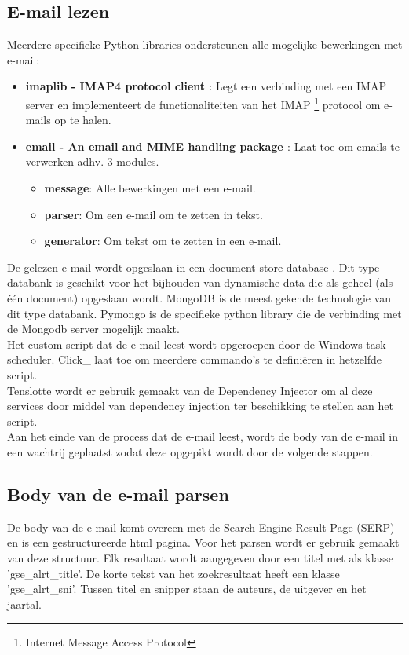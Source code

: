 \subsection{E-mail lezen}
Meerdere specifieke Python libraries ondersteunen alle mogelijke bewerkingen met e-mail:
\begin{itemize}
    \item \textbf{imaplib - IMAP4 protocol client \autocite{Imaplib2025}}: Legt een verbinding met een IMAP server en implementeert de functionaliteiten van het IMAP \footnote{Internet Message Access Protocol} protocol om e-mails op te halen.\autocite{Imap2025}
    \item \textbf{email - An email and MIME handling package \autocite{Email2025}}: Laat toe om emails te verwerken adhv. 3 modules.
    \begin{itemize}
        \item \textbf{message}: Alle bewerkingen met een e-mail.
        \item \textbf{parser}: Om een e-mail om te zetten in tekst.
        \item \textbf{generator}: Om tekst om te zetten in een e-mail. 
    \end{itemize}
\end{itemize}
De gelezen e-mail wordt opgeslaan in een document store database \autocite{Documentstore2025}. Dit type databank is geschikt voor het bijhouden van dynamische data die als geheel (als één document) opgeslaan wordt. MongoDB \autocite{Mongodb2025} is de meest gekende technologie van dit type databank. Pymongo \autocite{Pymongo2025} is de specifieke python library die de verbinding met de Mongodb server mogelijk maakt.\\
Het custom script dat de e-mail leest wordt opgeroepen door de Windows task scheduler. Click\_ \autocite{Click2025} laat toe om meerdere commando's te definiëren in hetzelfde script.\\
Tenslotte wordt er gebruik gemaakt van de Dependency Injector \autocite{Dependencyinjector2025} om al deze services door middel van dependency injection \autocite{Di2025} ter beschikking te stellen aan het script.\\
Aan het einde van de process dat de e-mail leest, wordt de body van de e-mail in een wachtrij geplaatst zodat deze opgepikt wordt door de volgende stappen.
\subsection{Body van de e-mail parsen}
De body van de e-mail komt overeen met de Search Engine Result Page (SERP) en is een gestructureerde html pagina. Voor het parsen wordt er gebruik gemaakt van deze structuur.
Elk resultaat wordt aangegeven door een titel met als klasse 'gse_alrt_title'. De korte tekst van het zoekresultaat heeft een klasse 'gse_alrt_sni'. Tussen titel en snipper staan de auteurs, de uitgever en het jaartal. 
